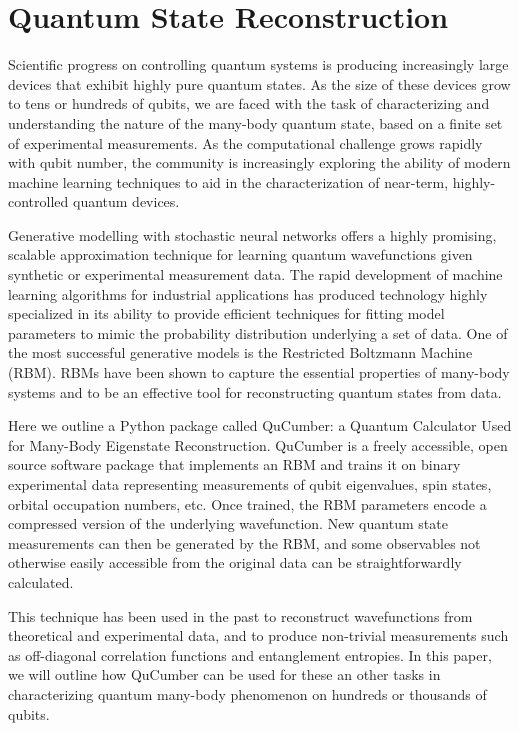 \documentclass[submission, Phys]{SciPost}
\begin{document}
\section{Quantum State Reconstruction}

Scientific progress on controlling quantum systems is producing increasingly large devices that exhibit highly pure quantum states.  As the size of these devices grow to tens or hundreds of qubits, we are faced with the task of characterizing and understanding the nature of the many-body quantum state, based on a finite set of experimental measurements.  As the computational challenge grows rapidly with qubit number, the community is increasingly exploring the ability of modern machine learning techniques to aid in the characterization of near-term, highly-controlled quantum devices.

Generative modelling with stochastic neural networks offers a highly promising, scalable approximation technique for learning quantum wavefunctions given synthetic or experimental measurement data.  The rapid development of machine learning algorithms for industrial applications has produced technology highly specialized in its ability to provide efficient techniques for fitting model parameters to mimic the probability distribution underlying a set of data.  One of the most successful generative models is the Restricted Boltzmann Machine (RBM).  RBMs have been shown to capture the essential properties of many-body systems and to be an effective tool for reconstructing quantum states from data.

Here we outline a Python package called QuCumber: a Quantum Calculator Used for Many-Body Eigenstate Reconstruction.  QuCumber is a freely accessible, open source software package that implements an RBM and trains it on binary experimental data representing measurements of qubit eigenvalues, spin states, orbital occupation numbers, etc.  Once trained, the RBM parameters encode a compressed version of the underlying wavefunction.  New quantum state measurements can then be generated by the RBM, and some observables not otherwise easily accessible from the original data can be straightforwardly calculated.

This technique has been used in the past to reconstruct wavefunctions from theoretical and experimental data, and to produce non-trivial measurements such as off-diagonal correlation functions and entanglement entropies.
In this paper, we will outline how QuCumber can be used for these an other tasks in characterizing quantum many-body phenomenon on hundreds or thousands of qubits.
\end{document}
